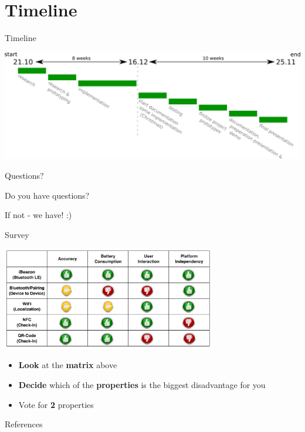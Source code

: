 \documentclass[9pt]{beamer}
\begin{document}
\section{Timeline}

\begin{frame}{Timeline}

	\begin{center}
		
		\includegraphics[width=\textwidth]{Timeline}%

	\end{center}

\end{frame}

\begin{frame}{Questions?}

	\begin{center}

		{\Huge Do you have questions?}
		
		\vspace{1cm}
		
		{\Large If not - we have! :)}
		
	\end{center}

\end{frame}

\begin{frame}{Survey}

	\begin{center}

		\includegraphics[width=0.7\textwidth]{matrix}
		
	\end{center}

	\begin{itemize}
		\item \textbf{Look} at the \textbf{matrix} above
		\item \textbf{Decide} which of the \textbf{properties} is the biggest disadvantage for you
		\item Vote for \textbf{2} properties
	\end{itemize}

\end{frame}


\begin{frame}[allowframebreaks]{References}

	

\end{frame}
\end{document}

